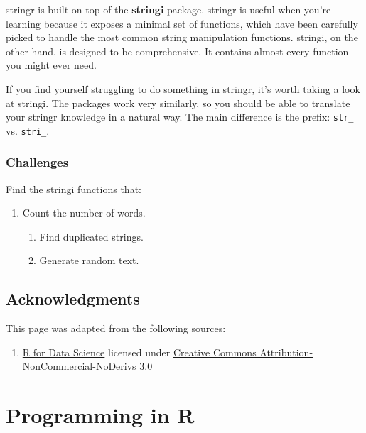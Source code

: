 \documentclass[]{book}
\providecommand{\tightlist}{%
  \setlength{\itemsep}{0pt}\setlength{\parskip}{0pt}}
\begin{document}
stringr is built on top of the \textbf{stringi} package. stringr is useful when you're learning because it exposes a minimal set of functions, which have been carefully picked to handle the most common string manipulation functions. stringi, on the other hand, is designed to be comprehensive. It contains almost every function you might ever need.

If you find yourself struggling to do something in stringr, it's worth taking a look at stringi. The packages work very similarly, so you should be able to translate your stringr knowledge in a natural way. The main difference is the prefix: \texttt{str\_} vs. \texttt{stri\_}.

\hypertarget{challenges-20}{%
\subsection{Challenges}\label{challenges-20}}

Find the stringi functions that:

\begin{enumerate}
\def\labelenumi{\arabic{enumi}.}
\tightlist
\item
  Count the number of words.

  \begin{enumerate}
  \def\labelenumii{\arabic{enumii}.}
  \setcounter{enumii}{1}
  \tightlist
  \item
    Find duplicated strings.
  \item
    Generate random text.
  \end{enumerate}
\end{enumerate}

\hypertarget{acknowledgments-5}{%
\section*{Acknowledgments}\label{acknowledgments-5}}

This page was adapted from the following sources:

\begin{enumerate}
\def\labelenumi{\arabic{enumi}.}
\tightlist
\item
  \href{https://r4ds.had.co.nz}{R for Data Science} licensed under \href{https://creativecommons.org/licenses/by-nc-nd/3.0/us/}{Creative Commons Attribution-NonCommercial-NoDerivs 3.0}
\end{enumerate}

\hypertarget{programming-in-r}{%
\chapter{Programming in R}\label{programming-in-r}}
\end{document}
